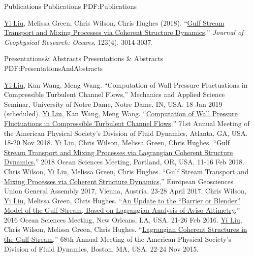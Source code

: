 \documentclass[letterpaper,MMMyyyy,nonstopmode]{simpleresumecv}
\begin{document}
\begin{Body}

\Section
{Publications}
{Publications}
{PDF:Publications}

    \Entry
    \underline{Yi Liu}, Melissa Green, Chris Wilson, Chris Hughes (2018).
        ``\href{https://doi.org/10.1002/2017JC013390}{Gulf Stream Transport and Mixing Processes via Coherent Structure Dynamics},''
    \textit{Journal of Geophysical Research: Oceans}, 123(4), 3014-3037.
    \Gap


\Section
{Presentations\newline\& Abstracts}
{Presentations \& Abstracts}
{PDF:PresentationsAndAbstracts}

    \Entry
    \underline{Yi Liu}, Kan Wang, Meng Wang.
        ``Computation of Wall Pressure Fluctuations in Compressible Turbulent Channel Flows,''
    Mechanics and Applied Science Seminar, University of Notre Dame, Notre Dame, IN, USA. 18 Jan 2019 (scheduled).
    \Gap
    \Entry
    \underline{Yi Liu}, Kan Wang, Meng Wang.
        ``\href{http://meetings.aps.org/Meeting/DFD18/Session/A05.7}{Computation of Wall Pressure Fluctuations in Compressible Turbulent Channel Flows},''
    71st Annual Meeting of the American Physical Society's Division of Fluid Dynamics, Atlanta, GA, USA. 18-20 Nov 2018.
    \Gap
    \Entry
    \underline{Yi Liu}, Chris Wilson, Melissa Green, Chris Hughes.
        ``\href{https://agu.confex.com/agu/os18/meetingapp.cgi/Paper/308347}{Gulf Stream Transport and Mixing Processes via Lagrangian Coherent Structure Dynamics},''
    2018 Ocean Sciences Meeting, Portland, OR, USA. 11-16 Feb 2018.
    \Gap
    \Entry
    Chris Wilson, \underline{Yi Liu}, Melissa Green, Chris Hughes.
        ``\href{https://meetingorganizer.copernicus.org/EGU2017/EGU2017-10345.pdf}{Gulf Stream Transport and Mixing Processes via Coherent Structure Dynamics},''
    European Geosciences Union General Assembly 2017, Vienna, Austria. 23-28 April 2017.
    \Gap
    \Entry
    Chris Wilson, \underline{Yi Liu}, Melissa Green, Chris Hughes.
        ``\href{https://agu.confex.com/agu/os16/meetingapp.cgi/Paper/92464}{An Update to the “Barrier or Blender” Model of the Gulf Stream, Based on Lagrangian Analysis of Aviso Altimetry},''
    2016 Ocean Sciences Meeting, New Orleans, LA, USA. 21-26 Feb 2016.
    \Gap
    \Entry
    \underline{Yi Liu}, Chris Wilson, Melissa Green, Chris Hughes.
        ``\href{https://meetings.aps.org/Meeting/DFD15/Session/R28.5}{Lagrangian Coherent Structures in the Gulf Stream},''
    68th Annual Meeting of the American Physical Society's Division of Fluid Dynamics, Boston, MA, USA. 22-24 Nov 2015.
    \Gap


\end{Body}
\end{document}

